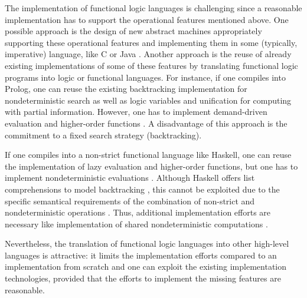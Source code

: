 \documentclass{llncs}
\begin{document}
The implementation of functional logic languages is challenging
since a reasonable implementation has to support the operational
features mentioned above.
One possible approach
is the design of new abstract machines appropriately supporting
these operational features and implementing them in some (typically,
imperative) language, like C \cite{Lux99FLOPS}
or Java \cite{AntoyHanusLiuTolmach05,HanusSadre99JFLP}.
Another approach is the reuse of already existing implementations
of some of these features by translating
functional logic programs into logic or functional languages.
For instance, if one compiles into Prolog, one can reuse
the existing backtracking implementation for nondeterministic
search as well as logic variables and unification for computing with partial
information. However, one has to implement demand-driven evaluation
and higher-order functions \cite{AntoyHanus00FROCOS}.
A disadvantage of this approach is the commitment to a fixed
search strategy (backtracking).

If one compiles into a non-strict functional language like Haskell,
one can reuse the implementation
of lazy evaluation and higher-order functions, but one has
to implement nondeterministic evaluations
\cite{BrasselFischerHanusReck11,BrasselHuch07}.
Although Haskell offers list comprehensions to model
backtracking \cite{Wadler85}, this cannot be exploited
due to the specific semantical requirements of the combination
of non-strict and nondeterministic operations
\cite{GonzalezEtAl99}. Thus, additional implementation efforts
are necessary like implementation of shared
nondeterministic computations \cite{FischerKiselyovShan09}.

Nevertheless, the translation of functional logic languages
into other high-level languages is attractive:
it limits the implementation efforts compared to an implementation
from scratch and one can exploit the existing implementation technologies,
provided that the efforts to implement the missing features
are reasonable.
\end{document}
